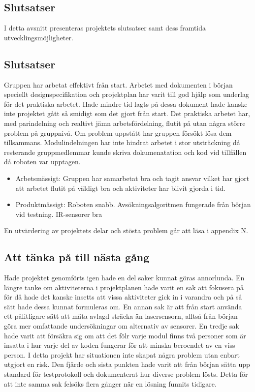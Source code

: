 \documentclass[11pt]{article}
\begin{document}
\begin{flushleft}
\pagebreak

\section{Slutsatser}
I detta avsnitt presenteras projektets slutsatser samt dess framtida utvecklingsmöjligheter.

\subsection{Slutsatser}
Gruppen har arbetat effektivt från start. Arbetet med dokumenten i början speciellt designspecifikation och projektplan har varit till god hjälp som underlag för det praktiska arbetet. Hade mindre tid lagts på dessa dokument hade kanske inte projektet gått så smidigt som det gjort från start. Det praktiska arbetet har, med parindelning och realtivt jämn arbetsfördelning, flutit på utan några större problem på gruppnivå. Om problem uppstått har gruppen försökt lösa dem tillsammans. Modulindelningen har inte hindrat arbetet i stor utsträckning då resterande gruppmedlemmar kunde skriva dokumenatation och kod vid tillfällen då roboten var upptagen. 

\begin{itemize}
\item Arbetsmässigt: Gruppen har samarbetat bra och tagit ansvar vilket har gjort att arbetet flutit på väldigt bra och aktiviteter har blivit gjorda i tid. 
\item Produktmässigt: Roboten snabb. Avsökningsalgoritmen fungerade från början vid testning. IR-sensorer bra
\end{itemize}

En utvärdering av projektets delar och stösta problem går att läsa i appendix N.

\subsection{Att tänka på till nästa gång}
Hade projektet genomförts igen hade en del saker kunnat göras annorlunda. En längre tanke om aktiviteterna i projektplanen hade varit en sak att fokusera på för då hade det kanske insetts att vissa aktiviteter gick in i varandra och på så sätt hade dessa kunnat formuleras om. En annan sak är att från start använda ett pålitligare sätt att mäta avlagd sträcka än lasersensorn, alltså från början göra mer omfattande undersökningar om alternativ av sensorer. En tredje sak hade varit att försäkra sig om att det fölr varje modul finns två personer som är insatta i hur varje del av koden fungerar för att minska beroendet av en viss person. I detta projekt har situationen inte skapat några problem utan enbart utgjort en risk. Den fjärde och sista punkten hade varit att från början sätta upp standard för testprotokoll och dokumenterat hur diverse problem lösts. Detta för att inte samma sak felsöks flera gånger när en lösning funnits tidigare. 


\end{flushleft}
\end{document}
